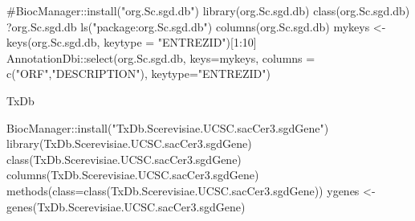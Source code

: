 \documentclass[
  a4paper,
]{book}
\newenvironment{Shaded}{\begin{snugshade}}{\end{snugshade}}
\newcommand{\AttributeTok}[1]{\textcolor[rgb]{0.40,0.45,0.13}{#1}}
\newcommand{\CommentTok}[1]{\textcolor[rgb]{0.37,0.37,0.37}{#1}}
\newcommand{\DecValTok}[1]{\textcolor[rgb]{0.68,0.00,0.00}{#1}}
\newcommand{\FunctionTok}[1]{\textcolor[rgb]{0.28,0.35,0.67}{#1}}
\newcommand{\NormalTok}[1]{\textcolor[rgb]{0.00,0.23,0.31}{#1}}
\newcommand{\OtherTok}[1]{\textcolor[rgb]{0.00,0.23,0.31}{#1}}
\newcommand{\SpecialCharTok}[1]{\textcolor[rgb]{0.37,0.37,0.37}{#1}}
\newcommand{\StringTok}[1]{\textcolor[rgb]{0.13,0.47,0.30}{#1}}
\begin{document}
\begin{Shaded}
\begin{Highlighting}[]
\CommentTok{\#BiocManager::install("org.Sc.sgd.db")}
\FunctionTok{library}\NormalTok{(org.Sc.sgd.db)}
\FunctionTok{class}\NormalTok{(org.Sc.sgd.db)}
\NormalTok{?org.Sc.sgd.db}
\FunctionTok{ls}\NormalTok{(}\StringTok{"package:org.Sc.sgd.db"}\NormalTok{)}
\FunctionTok{columns}\NormalTok{(org.Sc.sgd.db)}
\NormalTok{mykeys }\OtherTok{\textless{}{-}} \FunctionTok{keys}\NormalTok{(org.Sc.sgd.db, }\AttributeTok{keytype =} \StringTok{"ENTREZID"}\NormalTok{)[}\DecValTok{1}\SpecialCharTok{:}\DecValTok{10}\NormalTok{]}
\NormalTok{AnnotationDbi}\SpecialCharTok{::}\FunctionTok{select}\NormalTok{(org.Sc.sgd.db, }
                      \AttributeTok{keys=}\NormalTok{mykeys, }
                      \AttributeTok{columns =} \FunctionTok{c}\NormalTok{(}\StringTok{"ORF"}\NormalTok{,}\StringTok{"DESCRIPTION"}\NormalTok{),}
                      \AttributeTok{keytype=}\StringTok{"ENTREZID"}\NormalTok{)}
\end{Highlighting}
\end{Shaded}

TxDb

\begin{Shaded}
\begin{Highlighting}[]
\NormalTok{BiocManager}\SpecialCharTok{::}\FunctionTok{install}\NormalTok{(}\StringTok{"TxDb.Scerevisiae.UCSC.sacCer3.sgdGene"}\NormalTok{)}
\FunctionTok{library}\NormalTok{(TxDb.Scerevisiae.UCSC.sacCer3.sgdGene)}
\FunctionTok{class}\NormalTok{(TxDb.Scerevisiae.UCSC.sacCer3.sgdGene)}
\FunctionTok{columns}\NormalTok{(TxDb.Scerevisiae.UCSC.sacCer3.sgdGene)}
\FunctionTok{methods}\NormalTok{(}\AttributeTok{class=}\FunctionTok{class}\NormalTok{(TxDb.Scerevisiae.UCSC.sacCer3.sgdGene))}
\NormalTok{ygenes }\OtherTok{\textless{}{-}} \FunctionTok{genes}\NormalTok{(TxDb.Scerevisiae.UCSC.sacCer3.sgdGene)}
\end{Highlighting}
\end{Shaded}

\begin{Shaded}
\end{Shaded}
\end{document}

